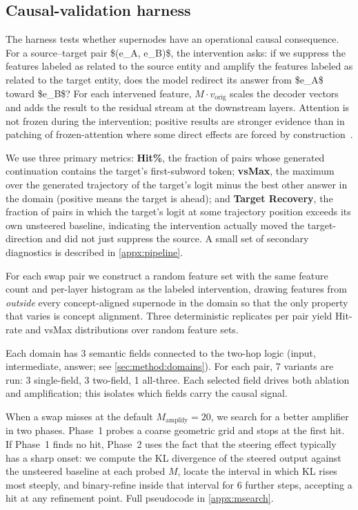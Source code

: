 \subsection{Causal-validation harness}
\label{sec:method:harness}
The harness tests whether supernodes have an operational causal consequence. For a source--target pair \$(e\_A, e\_B)\$, the intervention asks: if we suppress the features labeled as related to the source entity and amplify the features labeled as related to the target entity, does the model redirect its answer from \$e\_A\$ toward \$e\_B\$? 
For each intervened feature, $M \cdot v_{\mathrm{orig}}$ scales the decoder vectors and adds the result to the residual stream at the downstream layers. Attention is not frozen during the intervention; positive results are stronger evidence than in patching of frozen-attention where some direct effects are forced by construction~\cite{ameisen2025circuittracing}.

We use three primary metrics: \textbf{Hit\%}, the fraction of pairs whose generated continuation contains the target's first-subword token; \textbf{vsMax}, the maximum over the generated trajectory of the target's logit minus the best other answer in the domain (positive means the target is ahead); and \textbf{Target Recovery}, the fraction of pairs in which the target's logit at some trajectory position exceeds its own unsteered baseline, indicating the intervention actually moved the target-direction and did not just suppress the source. A small set of secondary diagnostics is described in \cref{appx:pipeline}.

For each swap pair we construct a random feature set with the same feature count and per-layer histogram as the labeled intervention, drawing features from \emph{outside} every concept-aligned supernode in the domain so that the only property that varies is concept alignment. Three deterministic replicates per pair yield Hit-rate and vsMax distributions over random feature sets. 

Each domain has 3 semantic fields connected to the two-hop logic (input, intermediate, answer; see \cref{sec:method:domains}). For each pair, 7 variants are run: 3 single-field, 3 two-field, 1 all-three. Each selected field drives both ablation and amplification; this isolates which fields carry the causal signal.

When a swap misses at the default $M_{\mathrm{amplify}}{=}20$, we search for a better amplifier in two phases. Phase~1 probes a coarse geometric grid and stops at the first hit. If Phase~1 finds no hit, Phase~2 uses the fact that the steering effect typically has a sharp onset: we compute the KL divergence of the steered output against the unsteered baseline at each probed $M$, locate the interval in which KL rises most steeply, and binary-refine inside that interval for 6 further steps, accepting a hit at any refinement point. Full pseudocode in \cref{appx:msearch}.
